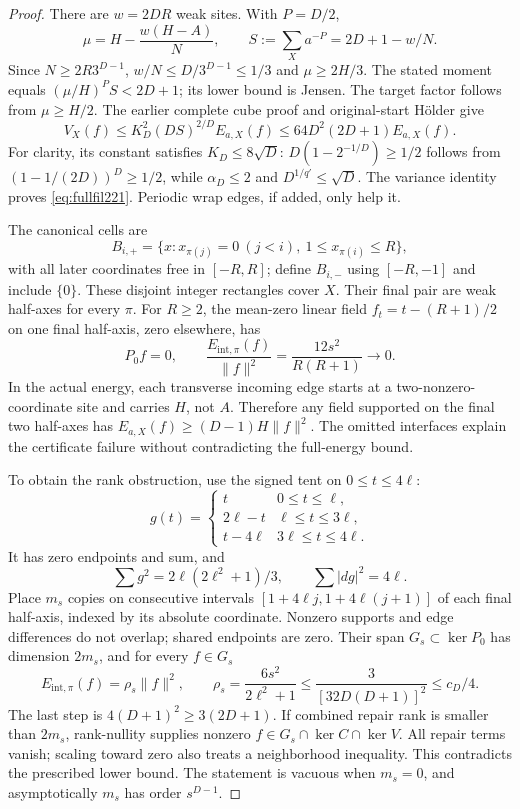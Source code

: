 \begin{proof}
There are $w=2DR$ weak sites. With $P=D/2$,
\[
 \mu=H-\frac{w(H-A)}N,\qquad S:=\sum_Xa^{-P}=2D+1-w/N.
\]
Since $N\ge2R3^{D-1}$, $w/N\le D/3^{D-1}\le1/3$ and
$\mu\ge2H/3$. The stated moment equals $(\mu/H)^PS<2D+1$;
its lower bound is Jensen. The target factor follows from $\mu\ge H/2$.
The earlier complete cube proof and original-start H\"older give
\[
 V_X(f)\le K_D^2(DS)^{2/D}E_{a,X}(f)
          \le64D^2(2D+1)E_{a,X}(f).
\]
For clarity, its constant satisfies $K_D\le8\sqrt D$:
$D(1-2^{-1/D})\ge1/2$ follows from
$(1-1/(2D))^D\ge1/2$, while $\alpha_D\le2$ and
$D^{1/q'}\le\sqrt D$. The variance identity proves
\eqref{eq:fullfil221}. Periodic wrap edges, if added, only help it.

The canonical cells are
\[
 B_{i,+}=\{x:x_{\pi(j)}=0\ (j<i),\ 1\le x_{\pi(i)}\le R\},
\]
with all later coordinates free in $[-R,R]$; define $B_{i,-}$ using
$[-R,-1]$ and include $\{0\}$. These disjoint integer rectangles
cover $X$. Their final pair are weak half-axes for every $\pi$.
For $R\ge2$, the mean-zero linear field $f_t=t-(R+1)/2$ on one final half-axis,
zero elsewhere, has
\[
 P_0f=0,\qquad
 \frac{E_{\mathrm{int},\pi}(f)}{\|f\|^2}
       =\frac{12s^2}{R(R+1)}\longrightarrow0.
\]
In the actual energy, each transverse incoming edge starts at a
two-nonzero-coordinate site and carries $H$, not $A$. Therefore any
field supported on the final two half-axes has
$E_{a,X}(f)\ge(D-1)H\|f\|^2$. The omitted interfaces explain the
certificate failure without contradicting the full-energy bound.

To obtain the rank obstruction, use the signed tent on $0\le t\le4\ell$:
\[
 g(t)=\begin{cases}t&0\le t\le\ell,\\
 2\ell-t&\ell\le t\le3\ell,\\t-4\ell&3\ell\le t\le4\ell.
 \end{cases}
\]
It has zero endpoints and sum, and
\[
 \sum g^2=2\ell(2\ell^2+1)/3,\qquad\sum|dg|^2=4\ell.
\]
Place $m_s$ copies on consecutive intervals
$[1+4\ell j,1+4\ell(j+1)]$ of each final half-axis, indexed by its
absolute coordinate. Nonzero supports and edge differences do not
overlap; shared endpoints are zero. Their span $G_s\subset\ker P_0$
has dimension $2m_s$, and for every $f\in G_s$
\[
 E_{\mathrm{int},\pi}(f)=\rho_s\|f\|^2,\qquad
 \rho_s=\frac{6s^2}{2\ell^2+1}
 \le\frac3{[32D(D+1)]^2}\le c_D/4.
\]
The last step is $4(D+1)^2\ge3(2D+1)$. If combined repair rank
is smaller than $2m_s$, rank-nullity supplies nonzero
$f\in G_s\cap\ker C\cap\ker V$. All repair terms vanish;
scaling toward zero also treats a neighborhood inequality. This
contradicts the prescribed lower bound. The statement is vacuous when
$m_s=0$, and asymptotically $m_s$ has order $s^{D-1}$.


\end{proof}
